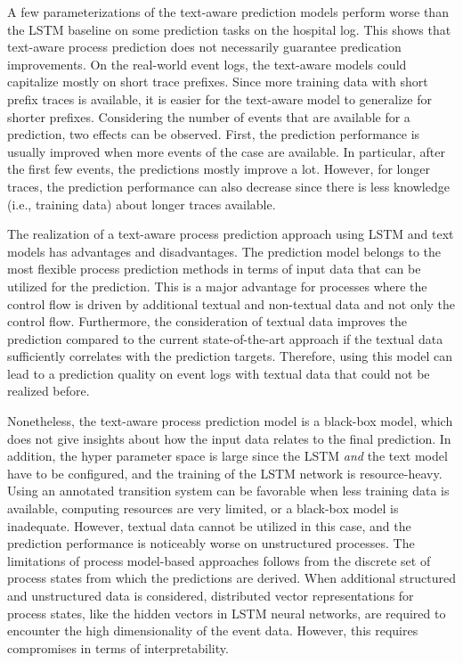 A few parameterizations of the text-aware prediction models perform worse than the LSTM baseline on some prediction tasks on the hospital log.
This shows that text-aware process prediction does not necessarily guarantee predication improvements.
On the real-world event logs, the text-aware models could capitalize mostly on short trace prefixes.
Since more training data with short prefix traces is available, it is easier for the text-aware model to generalize for shorter prefixes.
Considering the number of events that are available for a prediction, two effects can be observed.
First, the prediction performance is usually improved when more events of the case are available.
In particular, after the first few events, the predictions mostly improve a lot.
However, for longer traces, the prediction performance can also decrease since there is less knowledge (i.e., training data) about longer traces available.

The realization of a text-aware process prediction approach using LSTM and text models has advantages and disadvantages.
The prediction model belongs to the most flexible process prediction methods in terms of input data that can be utilized for the prediction.
This is a major advantage for processes where the control flow is driven by additional textual and non-textual data and not only the control flow.
Furthermore, the consideration of textual data improves the prediction compared to the current state-of-the-art approach if the textual data sufficiently correlates with the prediction targets.
Therefore, using this model can lead to a prediction quality on event logs with textual data that could not be realized before.

Nonetheless, the text-aware process prediction model is a black-box model, which does not give insights about how the input data relates to the final prediction.
In addition, the hyper parameter space is large since the LSTM \textit{and} the text model have to be configured, and the training of the LSTM network is resource-heavy.
Using an annotated transition system can be favorable when less training data is available, computing resources are very limited, or a black-box model is inadequate.
However, textual data cannot be utilized in this case, and the prediction performance is noticeably worse on unstructured processes.
The limitations of process model-based approaches follows from the discrete set of process states from which the predictions are derived.
When additional structured and unstructured data is considered, distributed vector representations for process states, like the hidden vectors in LSTM neural networks, are required to encounter the high dimensionality of the event data.
However, this requires compromises in terms of interpretability.